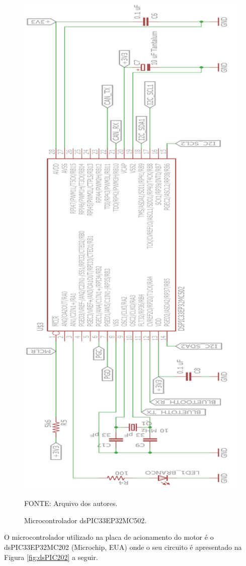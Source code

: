 \documentclass[
	12pt,				%
	openany,			%
	twoside,			%
	a4paper,			%
	english,			%
	french,				%
	spanish,			%
	brazil,				%
	oldfontcommands
	]{abntex2}
\begin{document}
\begin{figure}[th]
	\caption{Microcontrolador dsPIC33EP32MC502.}
	\centering
	\includegraphics[height=1.2\linewidth]{./figs/dsPIC_master}
	
	\begin{small}
		FONTE: Arquivo dos autores.
	\end{small}
	\label{fig:dsPIC502}
\end{figure} 

\newpage

O microcontrolador utilizado na placa de acionamento do motor é o dsPIC33EP32MC202 (Microchip, EUA) onde o seu circuito é apresentado na Figura \ref{fig:dsPIC202} a seguir.
\end{document}
